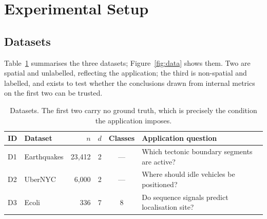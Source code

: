 \documentclass[11pt,a4paper]{article}
\begin{document}
\begin{table}[t]\centering\small
\caption{Structural assumptions of the four methods.}
\label{tab:assump}
\end{table}

\section{Experimental Setup}\label{sec:setup}

\subsection{Datasets}
Table~\ref{tab:data} summarises the three datasets; Figure~\ref{fig:data} shows
them. Two are spatial and unlabelled, reflecting the application; the third is
non-spatial and labelled, and exists to test whether the conclusions drawn from
internal metrics on the first two can be trusted.

\begin{table}[h]\centering\small
\caption{Datasets. The first two carry no ground truth, which is precisely the
condition the application imposes.}
\label{tab:data}
\begin{tabular}{llrrcl}
\toprule
\textbf{ID} & \textbf{Dataset} & \textbf{$n$} & \textbf{$d$} & \textbf{Classes} & \textbf{Application question} \\
\midrule
D1 & Earthquakes & 23{,}412 & 2 & --- & Which tectonic boundary segments are active? \\
D2 & UberNYC     & 6{,}000  & 2 & --- & Where should idle vehicles be positioned? \\
D3 & Ecoli       & 336      & 7 & 8   & Do sequence signals predict localisation site? \\
\bottomrule
\end{tabular}
\end{table}
\end{document}
